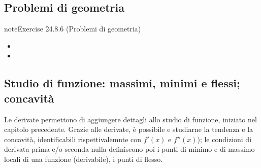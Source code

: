 \documentclass[letterpaper,10pt,italian]{jupyterBook}
\begin{document}
\subsection{Problemi di geometria}
\label{\detokenize{ch/infinitesimal_calculus/derivatives-problems:problemi-di-geometria}}\label{\detokenize{ch/infinitesimal_calculus/derivatives-problems:infinitesimal-calculus-derivatives-problems-geom}} \label{exercise:ch/infinitesimal_calculus/derivatives-problems-exercise-5}

\begin{sphinxadmonition}{note}{Exercise 24.8.6 (Problemi di geometria)}



\sphinxAtStartPar
{}
\begin{itemize}
\item {} 
\sphinxAtStartPar
{}

\item {} 
\sphinxAtStartPar
{}

\end{itemize}
\end{sphinxadmonition}


\subsection{Studio di funzione: massimi, minimi e flessi; concavità}
\label{\detokenize{ch/infinitesimal_calculus/derivatives-problems:studio-di-funzione-massimi-minimi-e-flessi-concavita}}\label{\detokenize{ch/infinitesimal_calculus/derivatives-problems:infinitesimal-calculus-derivatives-problems-fun}}
\sphinxAtStartPar
Le derivate permettono di aggiungere dettagli allo studio di funzione, iniziato nel capitolo precedente. Grazie alle derivate, è possibile e studiarne la tendenza e la concavità, identificabili rispettivalemnte con \(f'(x)\) e \(f''(x)\)); le condizioni di derivata prima e/o seconda nulla definiscono poi i punti di minimo e di massimo locali di una funzione (derivabile), i punti di flesso.
 \label{exercise:ch/infinitesimal_calculus/derivatives-problems-exercise-6}
\end{document}
